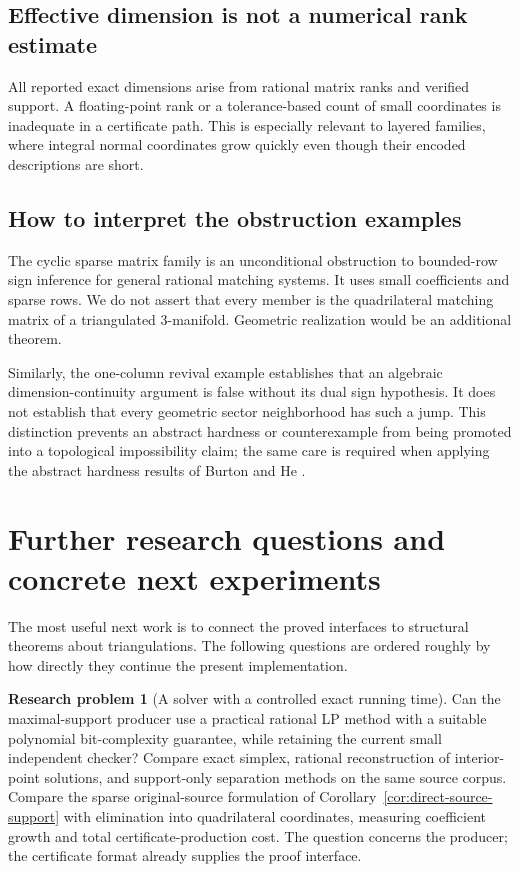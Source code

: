 \documentclass[11pt]{article}
\theoremstyle{definition}
\newtheorem{problem}[theorem]{Research problem}
\theoremstyle{remark}
\begin{document}
\subsection{Effective dimension is not a numerical rank estimate}

All reported exact dimensions arise from rational matrix ranks and
verified support. A floating-point rank or a tolerance-based count of
small coordinates is inadequate in a certificate path. This is
especially relevant to layered families, where integral normal
coordinates grow quickly even though their encoded descriptions are
short.

\subsection{How to interpret the obstruction examples}

The cyclic sparse matrix family is an unconditional obstruction to
bounded-row sign inference for general rational matching systems.
It uses small coefficients and sparse rows. We do not assert that every
member is the quadrilateral matching matrix of a triangulated
3-manifold. Geometric realization would be an additional theorem.

Similarly, the one-column revival example establishes that an algebraic
dimension-continuity argument is false without its dual sign hypothesis.
It does not establish that every geometric sector neighborhood has such
a jump. This distinction prevents an abstract hardness or counterexample
from being promoted into a topological impossibility claim; the same
care is required when applying the abstract hardness results of
Burton and He \cite{burton-he}.

\section{Further research questions and concrete next experiments}
\label{sec:future}

The most useful next work is to connect the proved interfaces to
structural theorems about triangulations. The following questions are
ordered roughly by how directly they continue the present implementation.

\begin{problem}[A solver with a controlled exact running time]
Can the maximal-support producer use a practical rational LP method with
a suitable polynomial bit-complexity guarantee, while retaining the
current small independent checker? Compare exact simplex, rational
reconstruction of interior-point solutions, and support-only separation
methods on the same source corpus. Compare the sparse original-source
formulation of Corollary~\ref{cor:direct-source-support} with elimination
into quadrilateral coordinates, measuring coefficient growth and total
certificate-production cost. The question concerns the producer;
the certificate format already supplies the proof interface.
\end{problem}
\end{document}
